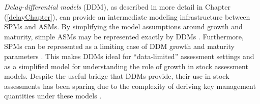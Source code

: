 \documentclass[12pt]{ucscthesis}
\begin{document}
%
{\it Delay-differential models} (DDM), as described in more detail in Chapter (\ref{delayChapter}), 
can provide an intermediate modeling infrastructure between SPMs and ASMs. By 
simplifying the model assumptions around growth and maturity, simple ASMs may 
be represented exactly by DDMs \cite{deriso_harvesting_1980, hilborn_quantitative_1992}. 
Furthermore, SPMs can be represented as a limiting case of DDM growth and 
maturity parameters \cite{walters_continuous_2020}. This makes DDMs ideal for ``data-limited'' assessment 
settings and as a simplified model for understanding the role of growth in 
stock assessment models. Despite the useful bridge that DDMs provide, their use in stock 
assessments has been sparing due to the complexity of deriving key management 
quantities under these models \cite{dick_depletion-based_2011, munyandorero_analytical_2023}.%


\end{document}
